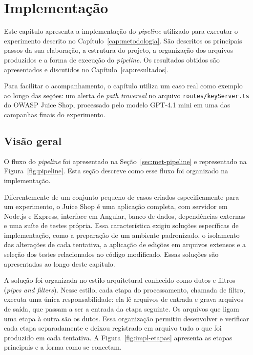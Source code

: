\chapter[Implementação]{Implementação}
\label{cap:implementacao}

Este capítulo apresenta a implementação do \textit{pipeline} utilizado para executar o experimento descrito no Capítulo~\ref{cap:metodologia}. São descritos os principais passos da sua elaboração, a estrutura do projeto, a organização dos arquivos produzidos e a forma de execução do \textit{pipeline}. Os resultados obtidos são apresentados e discutidos no Capítulo~\ref{cap:resultados}.

Para facilitar o acompanhamento, o capítulo utiliza um caso real como exemplo ao longo das seções: um alerta de \textit{path traversal} no arquivo \texttt{routes/keyServer.ts} do OWASP Juice Shop, processado pelo modelo GPT-4.1 mini em uma das campanhas finais do experimento.

\section{Visão geral}
\label{sec:impl-visao}

O fluxo do \textit{pipeline} foi apresentado na Seção~\ref{sec:met-pipeline} e representado na Figura~\ref{fig:pipeline}. Esta seção descreve como esse fluxo foi organizado na implementação.

Diferentemente de um conjunto pequeno de casos criados especificamente para um experimento, o Juice Shop é uma aplicação completa, com servidor em Node.js e Express, interface em Angular, banco de dados, dependências externas e uma suíte de testes própria. Essa característica exigiu soluções específicas de implementação, como a preparação de um ambiente padronizado, o isolamento das alterações de cada tentativa, a aplicação de edições em arquivos extensos e a seleção dos testes relacionados ao código modificado. Essas soluções são apresentadas ao longo deste capítulo.

A solução foi organizada no estilo arquitetural conhecido como dutos e filtros (\textit{pipes and filters}). Nesse estilo, cada etapa do processamento, chamada de filtro, executa uma única responsabilidade: ela lê arquivos de entrada e grava arquivos de saída, que passam a ser a entrada da etapa seguinte. Os arquivos que ligam uma etapa à outra são os dutos. Essa organização permitiu desenvolver e verificar cada etapa separadamente e deixou registrado em arquivo tudo o que foi produzido em cada tentativa. A Figura~\ref{fig:impl-etapas} apresenta as etapas principais e a forma como se conectam.

